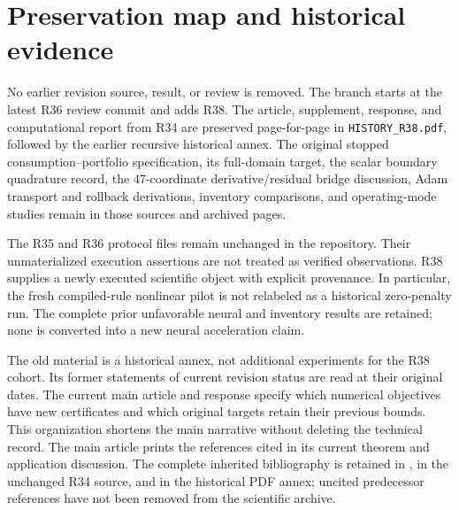 \section{Preservation map and historical evidence}
No earlier revision source, result, or review is removed. The branch starts at the latest R36 review commit and adds R38. The article, supplement, response, and computational report from R34 are preserved page-for-page in \texttt{HISTORY\_R38.pdf}, followed by the earlier recursive historical annex. The original stopped consumption--portfolio specification, its full-domain target, the scalar boundary quadrature record, the 47-coordinate derivative/residual bridge discussion, Adam transport and rollback derivations, inventory comparisons, and operating-mode studies remain in those sources and archived pages.

The R35 and R36 protocol files remain unchanged in the repository. Their unmaterialized execution assertions are not treated as verified observations. R38 supplies a newly executed scientific object with explicit provenance. In particular, the fresh compiled-rule nonlinear pilot is not relabeled as a historical zero-penalty run. The complete prior unfavorable neural and inventory results are retained; none is converted into a new neural acceleration claim.

The old material is a historical annex, not additional experiments for the R38 cohort. Its former statements of current revision status are read at their original dates. The current main article and response specify which numerical objectives have new certificates and which original targets retain their previous bounds. This organization shortens the main narrative without deleting the technical record.
The main article prints the references cited in its current theorem and application discussion. The complete inherited bibliography is retained in , in the unchanged R34 source, and in the historical PDF annex; uncited predecessor references have not been removed from the scientific archive.

